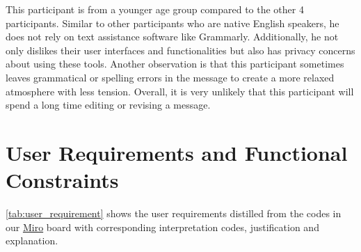 \documentclass[acmsmall,screen,authorversion,nonacm]{acmart}
\begin{document}
This participant is from a younger age group compared to the other 4 participants. Similar to other participants who are native English speakers, he does not rely on text assistance software like Grammarly. Additionally, he not only dislikes their user interfaces and functionalities but also has privacy concerns about using these tools. Another observation is that this participant sometimes leaves grammatical or spelling errors in the message to create a more relaxed atmosphere with less tension. Overall, it is very unlikely that this participant will spend a long time editing or revising a message. 

\section{User Requirements and Functional Constraints}
\autoref{tab:user_requirement} shows the user requirements distilled from the codes in our \href{https://miro.com/app/board/uXjVPNqwFH8=/?share_link_id=525314346088}{Miro} board with corresponding interpretation codes, justification and explanation.
\end{document}
